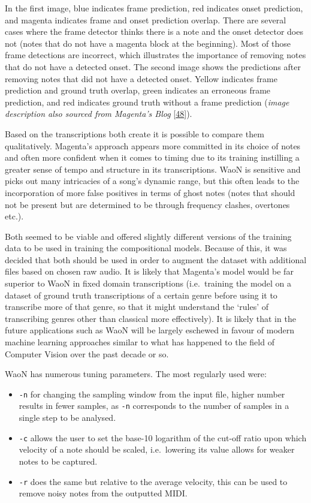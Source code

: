 \documentclass[12pt,]{article}
\providecommand{\tightlist}{%
  \setlength{\itemsep}{0pt}\setlength{\parskip}{0pt}}
\begin{document}
In the first image, blue indicates frame prediction, red indicates onset
prediction, and magenta indicates frame and onset prediction overlap.
There are several cases where the frame detector thinks there is a note
and the onset detector does not (notes that do not have a magenta block
at the beginning). Most of those frame detections are incorrect, which
illustrates the importance of removing notes that do not have a detected
onset. The second image shows the predictions after removing notes that
did not have a detected onset. Yellow indicates frame prediction and
ground truth overlap, green indicates an erroneous frame prediction, and
red indicates ground truth without a frame prediction
(\textit{image description also sourced from Magenta's Blog}
{[}\protect\hyperlink{ref-onsetsblog}{48}{]}).

Based on the transcriptions both create it is possible to compare them
qualitatively. Magenta's approach appears more committed in its choice
of notes and often more confident when it comes to timing due to its
training instilling a greater sense of tempo and structure in its
transcriptions. WaoN is sensitive and picks out many intricacies of a
song's dynamic range, but this often leads to the incorporation of more
false positives in terms of ghost notes (notes that should not be
present but are determined to be through frequency clashes, overtones
etc.).

Both seemed to be viable and offered slightly different versions of the
training data to be used in training the compositional models. Because
of this, it was decided that both should be used in order to augment the
dataset with additional files based on chosen raw audio. It is likely
that Magenta's model would be far superior to WaoN in fixed domain
transcriptions (i.e.~training the model on a dataset of ground truth
transcriptions of a certain genre before using it to transcribe more of
that genre, so that it might understand the `rules' of transcribing
genres other than classical more effectively). It is likely that in the
future applications such as WaoN will be largely eschewed in favour of
modern machine learning approaches similar to what has happened to the
field of Computer Vision over the past decade or so.

WaoN has numerous tuning parameters. The most regularly used were:

\begin{itemize}
\tightlist
\item
  \texttt{-n} for changing the sampling window from the input file,
  higher number results in fewer samples, as \texttt{-n} corresponds to
  the number of samples in a single step to be analysed.
\item
  \texttt{-c} allows the user to set the base-10 logarithm of the
  cut-off ratio upon which velocity of a note should be scaled,
  i.e.~lowering its value allows for weaker notes to be captured.
\item
  \texttt{-r} does the same but relative to the average velocity, this
  can be used to remove noisy notes from the outputted MIDI.
\end{itemize}
\end{document}
